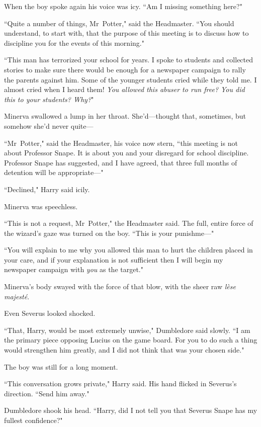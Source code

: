 When the boy spoke again his voice was icy. ``Am I missing something here?"

``Quite a number of things, Mr~Potter," said the Headmaster. ``You should understand, to start with, that the purpose of this meeting is to discuss how to discipline you for the events of this morning."

``This man has terrorized your school for years. I spoke to students and collected stories to make sure there would be enough for a newspaper campaign to rally the parents against him. Some of the younger students cried while they told me. I almost cried when I heard them! \emph{You allowed this abuser to run free? You did this to your students? Why?}"

Minerva swallowed a lump in her throat. She'd—thought that, sometimes, but somehow she'd never quite—

``Mr~Potter," said the Headmaster, his voice now stern, ``this meeting is not about Professor Snape. It is about you and your disregard for school discipline. Professor Snape has suggested, and I have agreed, that three full months of detention will be appropriate—"

``Declined," Harry said icily.

Minerva was speechless.

``This is not a request, Mr~Potter," the Headmaster said. The full, entire force of the wizard's gaze was turned on the boy. ``This is your punishme—"

``You will explain to me why you allowed this man to hurt the children placed in your care, and if your explanation is not sufficient then I will begin my newspaper campaign with \emph{you} as the target."

Minerva's body swayed with the force of that blow, with the sheer raw \emph{lèse majesté}.

Even Severus looked shocked.

``That, Harry, would be most extremely unwise," Dumbledore said slowly. ``I am the primary piece opposing Lucius on the game board. For you to do such a thing would strengthen him greatly, and I did not think that was your chosen side."

The boy was still for a long moment.

``This conversation grows private," Harry said. His hand flicked in Severus's direction. ``Send him away."

Dumbledore shook his head. ``Harry, did I not tell you that Severus Snape has my fullest confidence?"

